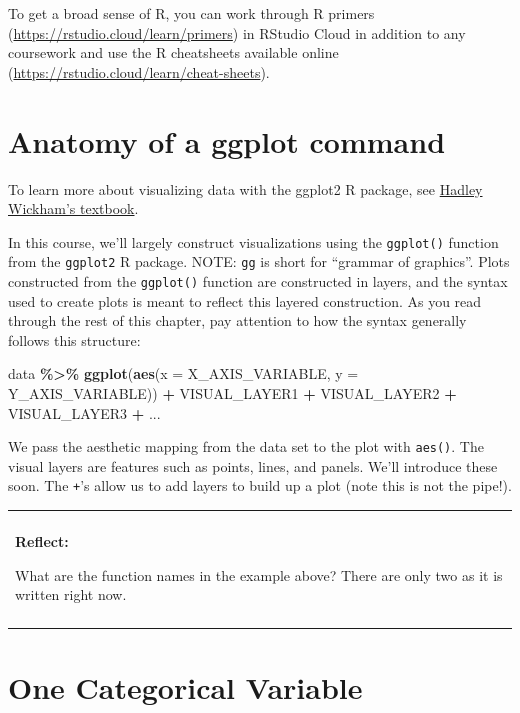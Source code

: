 \documentclass[
]{book}
\newenvironment{Shaded}{\begin{snugshade}}{\end{snugshade}}
\newcommand{\AttributeTok}[1]{\textcolor[rgb]{0.13,0.29,0.53}{#1}}
\newcommand{\FunctionTok}[1]{\textcolor[rgb]{0.13,0.29,0.53}{\textbf{#1}}}
\newcommand{\NormalTok}[1]{#1}
\newcommand{\SpecialCharTok}[1]{\textcolor[rgb]{0.81,0.36,0.00}{\textbf{#1}}}
\newenvironment{reflect}
{
    \begin{center}
    
    \begin{tabular}{|p{0.8\textwidth}|}
    \rowcolor{LightBlue}
    \hline\\
    \rowcolor{LightBlue}
    \textbf{Reflect:}
}
{
    \\\rowcolor{LightBlue}
    \\\hline
    \end{tabular} 
    \end{center}
}
\begin{document}
To get a broad sense of R, you can work through R primers (\url{https://rstudio.cloud/learn/primers}) in RStudio Cloud in addition to any coursework and use the R cheatsheets available online (\url{https://rstudio.cloud/learn/cheat-sheets}).

\section{Anatomy of a ggplot command}\label{anatomy-of-a-ggplot-command}

To learn more about visualizing data with the ggplot2 R package, see \href{https://r4ds.had.co.nz/data-visualisation.html}{Hadley Wickham's textbook}.

In this course, we'll largely construct visualizations using the \texttt{ggplot()} function from the \texttt{ggplot2} R package. NOTE: \texttt{gg} is short for ``grammar of graphics''. Plots constructed from the \texttt{ggplot()} function are constructed in layers, and the syntax used to create plots is meant to reflect this layered construction. As you read through the rest of this chapter, pay attention to how the syntax generally follows this structure:

\begin{Shaded}
\begin{Highlighting}[]
\NormalTok{data }\SpecialCharTok{\%\textgreater{}\%}
    \FunctionTok{ggplot}\NormalTok{(}\FunctionTok{aes}\NormalTok{(}\AttributeTok{x =}\NormalTok{ X\_AXIS\_VARIABLE, }\AttributeTok{y =}\NormalTok{ Y\_AXIS\_VARIABLE)) }\SpecialCharTok{+}
\NormalTok{    VISUAL\_LAYER1 }\SpecialCharTok{+}
\NormalTok{    VISUAL\_LAYER2 }\SpecialCharTok{+}
\NormalTok{    VISUAL\_LAYER3 }\SpecialCharTok{+}\NormalTok{ ...}
\end{Highlighting}
\end{Shaded}

We pass the aesthetic mapping from the data set to the plot with \texttt{aes()}. The visual layers are features such as points, lines, and panels. We'll introduce these soon. The \texttt{+}'s allow us to add layers to build up a plot (note this is not the pipe!).

\begin{reflect}
What are the function names in the example above? There are only two as
it is written right now.
\end{reflect}

\section{One Categorical Variable}\label{one-categorical-variable}
\end{document}
